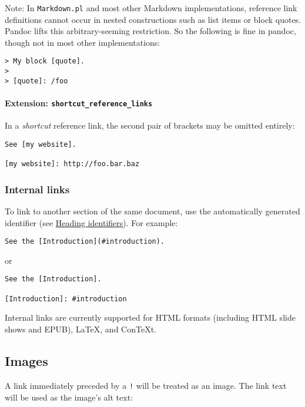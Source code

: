 \documentclass[
]{article}
\begin{document}
Note: In \texttt{Markdown.pl} and most other Markdown implementations,
reference link definitions cannot occur in nested constructions such as
list items or block quotes. Pandoc lifts this arbitrary-seeming
restriction. So the following is fine in pandoc, though not in most
other implementations:

\begin{verbatim}
> My block [quote].
>
> [quote]: /foo
\end{verbatim}

\paragraph{\texorpdfstring{Extension:
\texttt{shortcut\_reference\_links}}{Extension: shortcut\_reference\_links}}\label{extension-shortcut_reference_links}

In a \emph{shortcut} reference link, the second pair of brackets may be
omitted entirely:

\begin{verbatim}
See [my website].

[my website]: http://foo.bar.baz
\end{verbatim}

\subsubsection{Internal links}\label{internal-links}

To link to another section of the same document, use the automatically
generated identifier (see \hyperref[heading-identifiers]{Heading
identifiers}). For example:

\begin{verbatim}
See the [Introduction](#introduction).
\end{verbatim}

or

\begin{verbatim}
See the [Introduction].

[Introduction]: #introduction
\end{verbatim}

Internal links are currently supported for HTML formats (including HTML
slide shows and EPUB), LaTeX, and ConTeXt.

\subsection{Images}\label{images}

A link immediately preceded by a \texttt{!} will be treated as an image.
The link text will be used as the image's alt text:
\end{document}
